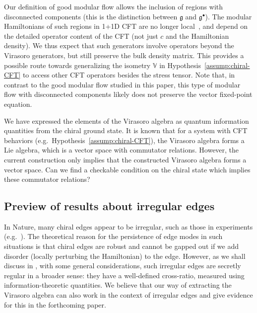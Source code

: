 \documentclass[12pt, nofootinbib]{article}
\theoremstyle{plain}
\theoremstyle{assumption}
\theoremstyle{definition}
\theoremstyle{plain}
\theoremstyle{plain}
\theoremstyle{plain}
\theoremstyle{plain}
\theoremstyle{plain}
\def\g{\mathfrak{g}} %
\def\gc{\mathfrak{g}^{\bullet}}
\begin{document}
Our definition of good modular flow allows the inclusion of regions with disconnected components (this is the distinction between 
$\g$ and $\gc$). The modular Hamiltonians of such regions in 1+1D CFT are no longer local~\cite{Casini2009,Cardy:2016fqc,Klich2017,Arias2018}, and depend on the detailed operator content of the CFT (not just $c$ and the Hamiltonian density).  
We thus expect that such generators involve operators beyond the Virasoro generators, but still preserve the bulk density matrix. This provides a possible route towards generalizing the isometry $\mathbb{V}$ in Hypothesis~\ref{assump:chiral-CFT} to access other CFT operators besides the stress tensor.
Note that, in contrast to the good modular flow studied in this paper, this type of modular flow with disconnected components likely does not preserve the vector fixed-point equation.

We have expressed the elements of the Virasoro algebra as quantum information quantities from the chiral ground state.
It is known that for a system with CFT behaviors (e.g.~Hypothesis~\ref{assump:chiral-CFT}), the Virasoro algebra forms a Lie algebra, which is a vector space with commutator relations.
However, the current construction only implies that the constructed Virasoro algebra forms a vector space.
Can we find a checkable condition on the chiral state which implies these commutator relations?

\subsection{Preview of results about irregular edges}

In Nature, many chiral edges appear to be irregular, such as those in experiments (e.g.~\cite{saminadayar1997observation,zhang2009distinct,ofek2010role,nakamura2020direct,Bartolomei2020,2023arXiv230711054S, veillon2024observation}). 
The theoretical reason for the persistence of edge modes in such situations is that chiral edges are robust and cannot be gapped out if we add disorder (locally perturbing the Hamiltonian) to the edge. However, as we shall discuss in \cite{q-cross-ratio}, with some general considerations, such irregular edges are secretly regular in a broader sense: they have a well-defined cross-ratio, measured using information-theoretic quantities. We believe that our way of extracting the Virasoro algebra can also work in the context of irregular edges and give evidence for this in the forthcoming paper.
\end{document}
